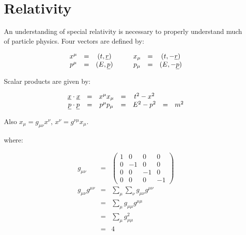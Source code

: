 
\chapter{Relativity}

An understanding of special relativity is necessary to properly understand much of particle physics.  Four vectors are defined by:

\[
  \begin{array}{ccccccc}
  x^{\mu} & = & (t,\underline{r}) & \quad & x_{\mu} & = & (t,-\underline{r}) \\
  p^{\mu} & = & (E,\underline{p}) & \quad & p_{\mu} & = & (E,-\underline{p}) 
  \end{array}
\]

Scalar products are given by:

\[
  \begin{array}{ccccccc}
  \underline{x}\cdot\underline{x} & = & x^{\mu}x_{\mu} & = & t^2 - x^2 &   & \\
  \underline{p}\cdot\underline{p} & = & p^{\mu}p_{\mu} & = & E^2 - p^2 & = & m^2
  \end{array}
\]

Also $x_{\mu} = g_{\mu\nu}x^{\nu}$, $x^{\nu} = g^{\nu\mu}x_{\mu}$.

where:

\begin{eqnarray*}
  g_{\mu\nu} & = &
  \left(
    \begin{array}{cccc}
    1 &  0 &  0 & 0 \\
    0 & -1 &  0 & 0 \\
    0 &  0 & -1 & 0 \\
    0 &  0 &  0 & -1
    \end{array}
  \right)
  \\
  g_{\mu\nu}g^{\mu\nu} & = & \displaystyle\sum_{\mu} \displaystyle\sum_{\nu} g_{\mu\nu}g^{\mu\nu} \\
  & = & \displaystyle\sum_{\mu}g_{\mu\mu}g^{\mu\mu} \\
  & = & \displaystyle\sum_{\mu}g_{\mu\mu}^2 \\
  & = & 4
\end{eqnarray*}

